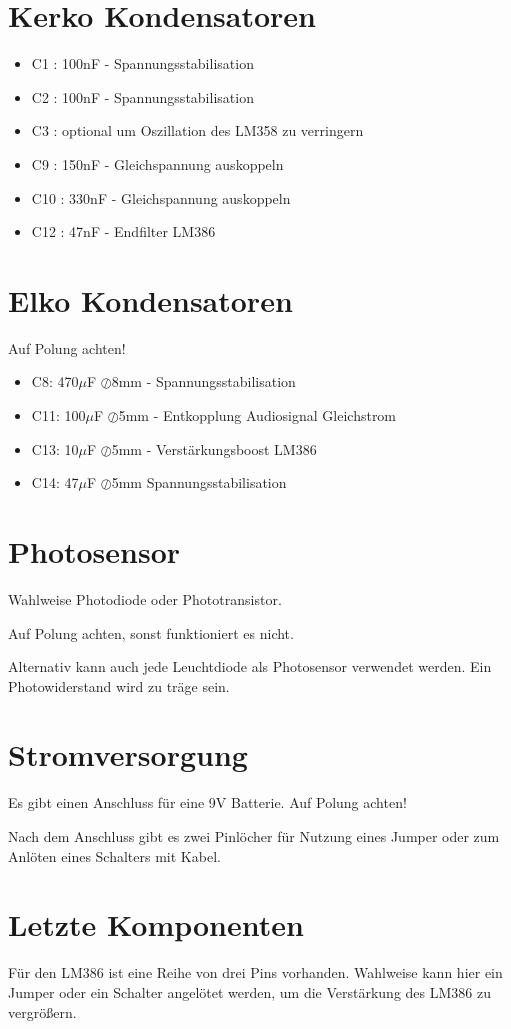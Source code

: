 \documentclass[]{article}
\begin{document}
\section{Kerko Kondensatoren}
\begin{itemize}
	\item C1 : 100nF - Spannungsstabilisation
	\item C2 : 100nF - Spannungsstabilisation
	\item C3 : optional um Oszillation des LM358 zu verringern
	\item C9 : 150nF - Gleichspannung auskoppeln
	\item C10 : 330nF - Gleichspannung auskoppeln
	\item C12 : 47nF - Endfilter LM386
	
\end{itemize}
\section{Elko Kondensatoren}
Auf Polung achten!
\begin{itemize}
	\item C8: 470$\mu$F $\oslash$8mm - Spannungsstabilisation
	\item C11: 100$\mu$F $\oslash$5mm - Entkopplung Audiosignal Gleichstrom
	\item C13: 10$\mu$F $\oslash$5mm - Verstärkungsboost LM386
	\item C14: 47$\mu$F  $\oslash$5mm Spannungsstabilisation
\end{itemize}
\section{Photosensor}
Wahlweise Photodiode oder Phototransistor.

Auf Polung achten, sonst funktioniert es nicht.

Alternativ kann auch jede Leuchtdiode als Photosensor verwendet werden. Ein Photowiderstand wird zu träge sein.
\section{Stromversorgung}
Es gibt einen Anschluss für eine 9V Batterie. Auf Polung achten!

Nach dem Anschluss gibt es zwei Pinlöcher für Nutzung eines Jumper oder zum Anlöten eines Schalters mit Kabel.

\section{Letzte Komponenten}
Für den LM386 ist eine Reihe von drei Pins vorhanden. Wahlweise kann hier ein Jumper oder ein Schalter angelötet werden, um die Verstärkung des LM386 zu vergrößern.
\end{document}

